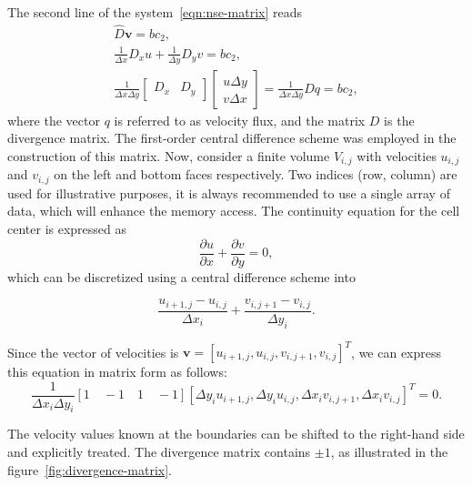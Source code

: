 \documentclass{article}
\begin{document}
The second line of the system~\ref{eqn:nse-matrix} reads
\begin{equation}
\begin{gathered}
\hat{D}\boldsymbol{v}=bc_2,\\
\frac{1}{\Delta x} D_x u+\frac{1}{\Delta y} D_y v=bc_2, \\
\frac{1}{\Delta x \Delta y}\left[\begin{array}{ll}
D_x & D_y
\end{array}\right]\left[\begin{array}{l}
u \Delta y \\
v \Delta x
\end{array}\right]=\frac{1}{\Delta x \Delta y} D q=bc_2,
\end{gathered}
\end{equation}
where the vector $q$ is referred to as velocity flux, and the matrix $D$ is the divergence matrix. The first-order central difference scheme was employed in the construction of this matrix. Now, consider a finite volume $V_{i,j}$  with velocities $u_{i,j}$ and $v_{i,j}$ on the left and bottom faces respectively. Two indices (row, column) are used for illustrative purposes, it is always recommended to use a single array of data, which will enhance the memory access. The continuity equation for the cell center is expressed as
\begin{equation}
	\frac{\partial u}{\partial x} + \frac{\partial v}{\partial y}=0,
\end{equation}
which can be discretized using a central difference scheme into

\begin{equation}
  \frac{u_{i+1,j} - u_{i,j}}{\Delta x_i}+  \frac{v_{i,j+1} - v_{i,j}}{\Delta y_i}.
\end{equation}

Since the vector of velocities is $\boldsymbol{v}=[u_{i+1,j}, u_{i,j}, v_{i,j+1}, v_{i,j}]^T$, we can express this equation in matrix form as follows:
\begin{equation}
  \frac{1}{\Delta x_i \Delta y_i}\left[1\quad -1\quad1\quad-1\right] \left[\Delta y_i u_{i+1,j}, \Delta y_i  u_{i,j}, \Delta x_i v_{i,j+1}, \Delta x_i v_{i,j}\right]^T=0.
\end{equation}

The velocity values known at the boundaries can be shifted to the right-hand side and explicitly treated. The divergence matrix contains $\pm1$, as illustrated in the figure~\ref{fig:divergence-matrix}.
\end{document}
